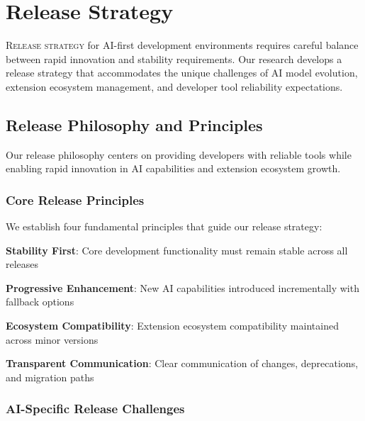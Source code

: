 
\section*{Release Strategy}

\lettrine{R}{elease strategy} for AI-first development environments requires careful balance between rapid innovation and stability requirements. Our research develops a release strategy that accommodates the unique challenges of AI model evolution, extension ecosystem management, and developer tool reliability expectations.

\subsection*{Release Philosophy and Principles}

Our release philosophy centers on providing developers with reliable tools while enabling rapid innovation in AI capabilities and extension ecosystem growth.

\subsubsection*{Core Release Principles}

We establish four fundamental principles that guide our release strategy:

\begin{expandedlist}
    \item \textbf{Stability First}: Core development functionality must remain stable across all releases
    \item \textbf{Progressive Enhancement}: New AI capabilities introduced incrementally with fallback options
    \item \textbf{Ecosystem Compatibility}: Extension ecosystem compatibility maintained across minor versions
    \item \textbf{Transparent Communication}: Clear communication of changes, deprecations, and migration paths
\end{expandedlist}

\subsubsection*{AI-Specific Release Challenges}

